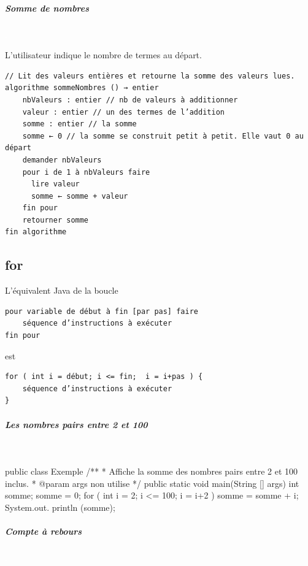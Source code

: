 \documentclass[11pt,a4paper]{article}
\begin{document}
		\subparagraph{Somme de nombres} 
		
					\textcolor{white}{.} \par
				L'utilisateur indique le nombre de termes au d\'epart.
            \par
        \begin{verbatim}
// Lit des valeurs entières et retourne la somme des valeurs lues.
algorithme sommeNombres () → entier
    nbValeurs : entier // nb de valeurs à additionner
    valeur : entier // un des termes de l’addition
    somme : entier // la somme
    somme ← 0 // la somme se construit petit à petit. Elle vaut 0 au départ
    demander nbValeurs
    pour i de 1 à nbValeurs faire
      lire valeur
      somme ← somme + valeur
    fin pour
    retourner somme
fin algorithme
    \end{verbatim}\subsection{for}
		    L'\'equivalent Java de la boucle 
		  
            \par
        \begin{verbatim}
pour variable de début à fin [par pas] faire
    séquence d’instructions à exécuter
fin pour
      \end{verbatim}est 
            \par
        \begin{verbatim}
for ( int i = début; i <= fin;  i = i+pas ) {
    séquence d’instructions à exécuter
}
  \end{verbatim}
			
		\subparagraph{Les nombres pairs entre 2 et 100} 
		
					\textcolor{white}{.} \par
				
            \par
        \begin{Java}
public class Exemple {
    /**
    * Affiche la somme des nombres pairs entre 2 et 100 inclus.
    * @param args non utilise
    */
    public static void main(String [] args) {
      int somme;
      somme = 0;
      for ( int i = 2; i <= 100; i = i+2 ) {
        somme = somme + i;
      }
      System.out. println (somme);
    }
}\end{Java}
			
		\subparagraph{Compte \`a rebours} 
		
					\textcolor{white}{.} \par
				
\end{document}
